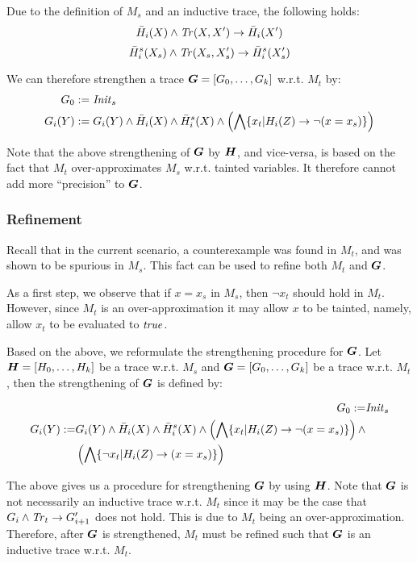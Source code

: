Due to the definition of $M_s$ and an inductive trace, the following holds:
    $$\bar{H}_i(X)\land\mathit{Tr}(X,X')\to\bar{H}_i(X')$$  $$\bar{H}^s_i(X_s)\land\mathit{Tr}(X_s,X_s')\to\bar{H}^s_i(X_s')$$
    
We can therefore strengthen a trace $\vG = [G_0,\ldots,G_k]$ w.r.t. $M_t$ by:
\begin{align}
    G_0 &:= \mathit{Init}_s \\
    G_i(Y) &:= G_i(Y)\land\bar{H}_i(X)\land\bar{H}^s_i(X)\land\left(\bigwedge\{ x_t | H_i(Z)\to \neg (x = x_s) \}\right)
\end{align}

Note that the above strengthening of $\vG$ by $\vH$, and vice-versa, is based on the fact that $M_t$ over-approximates $M_s$ w.r.t. tainted variables. It therefore cannot add more ``precision'' to $\vG$.

\subsubsection{Refinement}

Recall that in the current scenario, a counterexample was found in $M_t$, and was shown to be 
spurious in $M_s$. This fact can be used to refine both $M_t$ and $\vG$.

As a first step, we observe that if $x = x_s$ in $M_s$, then $\neg x_t$ should hold in $M_t$.
However, since $M_t$ is an over-approximation it may allow $x$ to be tainted, namely, allow $x_t$
to be evaluated to $\mathit{true}$.

Based on the above, we reformulate the strengthening procedure for $\vG$. 
Let $\vH = [H_0,\ldots,H_k]$ be a trace w.r.t. $M_s$ and $\vG = [G_0,\ldots, G_k]$
be a trace w.r.t. $M_t$, then the strengthening of $\vG$ is defined by:

\begin{align}
    G_0    := & \mathit{Init}_s \\
    \begin{split}
    G_i(Y) := & G_i(Y)\land\bar{H}_i(X)\land\bar{H}^s_i(X)\land\left(\bigwedge\{ x_t | H_i(Z)\to \neg (x = x_s) \}\right)\land\\
    & \left(\bigwedge\{ \neg x_t | H_i(Z)\to (x = x_s) \}\right)
    \end{split}
\end{align}

The above gives us a procedure for strengthening $\vG$ by using $\vH$. Note that $\vG$ is not necessarily an inductive trace w.r.t. $M_t$ since it may be the case that $G_i\land\mathit{Tr}_t\to G_{i+1}'$ does not hold. This is due to $M_t$ being an over-approximation. Therefore, after $\vG$ is strengthened, $M_t$ must be refined such that $\vG$ is an inductive trace w.r.t. $M_t$.

